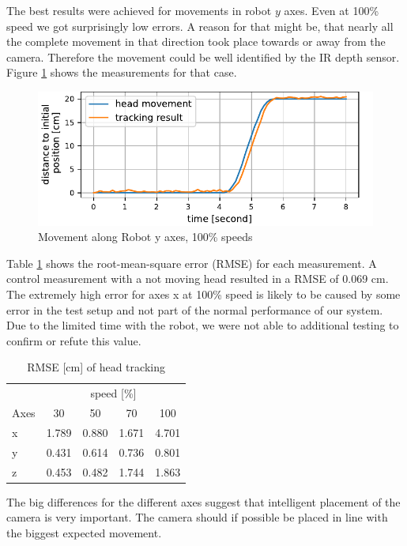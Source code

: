 The best results were achieved for movements in robot $y$ axes. Even at 100\% speed we got surprisingly low errors. A reason for that might be, that nearly all the complete movement in that direction took place towards or away from the camera. Therefore the movement could be well identified by the IR depth sensor. Figure \ref{fig:y100} shows the measurements for that case. 


\begin{figure}[ht]
    \centering
    \includegraphics[width=\linewidth]{tracking_eval_y100_single}
    \caption{Movement along Robot y axes, 100\% speeds}
    \label{fig:y100}
\end{figure}

Table \ref{tab:rmse} shows the root-mean-square error (RMSE) for each measurement. A control measurement with a not moving head resulted in a RMSE of 0.069 cm. The extremely high error for axes x at 100\% speed is likely to be caused by some error in the test setup and not part of the normal performance of our system. Due to the limited time with the robot, we were not able to additional testing to confirm or refute this value. 


\begin{table}[hbt]
    \caption{RMSE [cm] of head tracking}
    \centering
    \begin{tabular}{l|cccc}
        \toprule
        & \multicolumn{4}{c}{speed [\%]} \\
        Axes & 30 & 50 & 70 & 100 \\
        \midrule
        x & 1.789 & 0.880 & 1.671 & 4.701 \\
        y & 0.431 & 0.614 & 0.736 & 0.801 \\
        z & 0.453 & 0.482 & 1.744 & 1.863 \\
        \bottomrule
    \end{tabular}
    \label{tab:rmse}
\end{table}

The big differences for the different axes suggest that intelligent placement of the camera is very important. The camera should if possible be placed in line with the biggest expected movement.  

